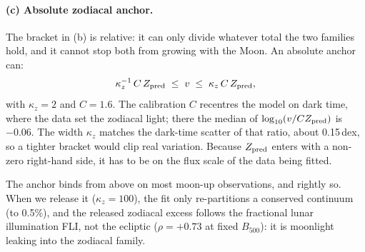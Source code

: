\paragraph{(c) Absolute zodiacal anchor.} The bracket in (b) is relative: it
can only divide whatever total the two families hold, and it cannot stop both
from growing with the Moon. An absolute anchor can:
\begin{equation}
  \kappa_z^{-1}\,C\,Z_{\rm pred} \;\le\; v \;\le\; \kappa_z\,C\,Z_{\rm pred},
\end{equation}
with $\kappa_z = 2$ and $C = 1.6$. The calibration $C$ recentres the model
on dark time, where the data set the zodiacal light; there the median of
$\log_{10}(v/C Z_{\rm pred})$ is $-0.06$. The width $\kappa_z$ matches the
dark-time scatter of that ratio, about 0.15\,dex, so a tighter bracket would
clip real variation. Because $Z_{\rm pred}$ enters with a non-zero right-hand
side, it has to be on the flux scale of the data being fitted.

The anchor binds from above on most moon-up observations, and rightly so.
When we release it ($\kappa_z = 100$), the fit only re-partitions a conserved
continuum (to 0.5\%), and the released zodiacal excess follows the fractional
lunar illumination FLI, not the ecliptic ($\rho = +0.73$ at fixed $B_{500}$):
it is moonlight leaking into the zodiacal family.

